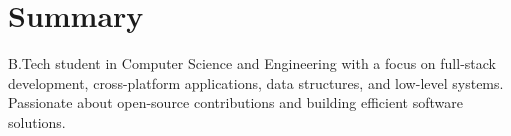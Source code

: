 \section{Summary}
B.Tech student in Computer Science and Engineering with a focus on full-stack development, cross-platform applications, data structures, and low-level systems. Passionate about open-source contributions and building efficient software solutions.
